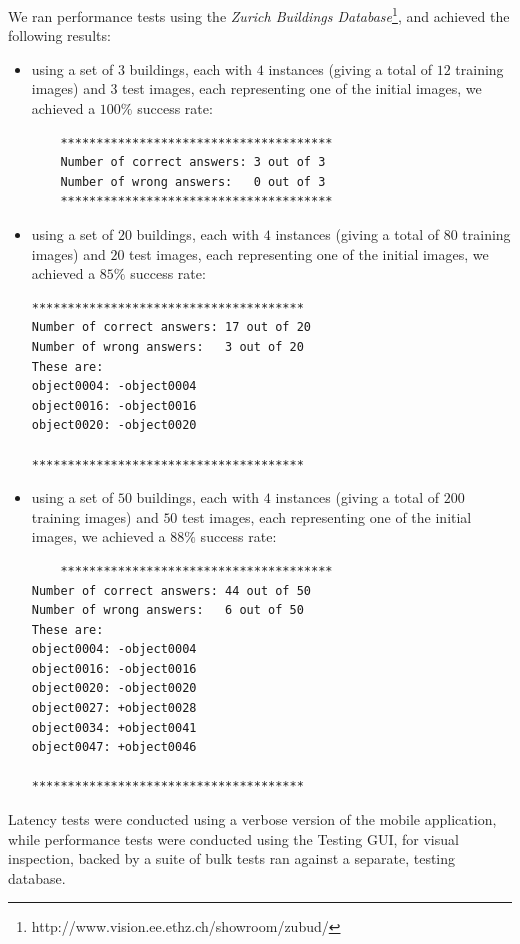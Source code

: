 \documentclass[a4paper,onecolumn,oneside,titlepage,11pt]{report}
\begin{document}
We ran performance tests using the \emph{Zurich Buildings Database}\footnote{http://www.vision.ee.ethz.ch/showroom/zubud/}, and achieved the following results:
\begin{itemize}
	\item using a set of $3$ buildings, each with $4$ instances (giving a total of $12$ training images) and $3$ test images, each representing one of the initial images, we achieved a $100\%$ success rate:
	\begin{verbatim}
	**************************************
	Number of correct answers: 3 out of 3
	Number of wrong answers:   0 out of 3
	**************************************
	\end{verbatim}
	\item using a set of $20$ buildings, each with $4$ instances (giving a total of $80$ training images) and $20$ test images, each representing one of the initial images, we achieved a $85\%$ success rate:
	\begin{verbatim}
**************************************
Number of correct answers: 17 out of 20
Number of wrong answers:   3 out of 20
These are: 
object0004: -object0004 
object0016: -object0016 
object0020: -object0020 

**************************************
	\end{verbatim}
	\item using a set of $50$ buildings, each with $4$ instances (giving a total of $200$ training images) and $50$ test images, each representing one of the initial images, we achieved a $88\%$ success rate:
	\begin{verbatim}
	**************************************
Number of correct answers: 44 out of 50
Number of wrong answers:   6 out of 50
These are: 
object0004: -object0004 
object0016: -object0016 
object0020: -object0020 
object0027: +object0028 
object0034: +object0041 
object0047: +object0046 

**************************************
	\end{verbatim}
\end{itemize}

Latency tests were conducted using a verbose version of the mobile application, while performance tests were conducted using the Testing GUI, for visual inspection, backed by a suite of bulk tests ran against a separate, testing database.
\end{document}
